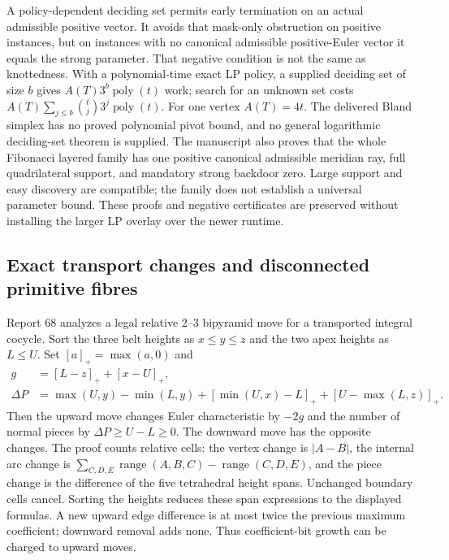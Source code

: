 A policy-dependent deciding set permits early termination on an actual
admissible positive vector. It avoids that mask-only obstruction on positive
instances, but on instances with no canonical admissible positive-Euler
vector it equals the strong parameter. That negative condition is not the
same as knottedness. With a polynomial-time exact LP policy, a supplied
deciding set of size $b$ gives $A(T)3^b\operatorname{poly}(t)$ work; search
for an unknown set costs
$A(T)\sum_{j\le b}\binom tj3^j\operatorname{poly}(t)$.
For one vertex $A(T)=4t$. The delivered Bland simplex has no proved
polynomial pivot bound, and no general logarithmic deciding-set theorem
is supplied. The manuscript also proves that the whole Fibonacci layered
family has one positive canonical admissible meridian ray, full
quadrilateral support, and mandatory strong backdoor zero. Large support
and easy discovery are compatible; the family does not establish a
universal parameter bound. These proofs and negative certificates are
preserved without installing the larger LP overlay over the newer runtime.

\subsection{Exact transport changes and disconnected primitive fibres}

Report 68 analyzes a legal relative $2$--$3$ bipyramid move for a transported
integral cocycle. Sort the three belt heights as $x\le y\le z$ and the
two apex heights as $L\le U$. Set $[a]_+=\max(a,0)$ and
\begin{align*}
 g&=[L-z]_+ +[x-U]_+,\\
 \Delta P&=\max(U,y)-\min(L,y)
       +[\min(U,x)-L]_+ +[U-\max(L,z)]_+.
\end{align*}
Then the upward move changes Euler characteristic by $-2g$ and the number
of normal pieces by $\Delta P\ge U-L\ge0$. The downward move has the
opposite changes. The proof counts relative cells: the vertex change is
$|A-B|$, the internal arc change is
$\sum_{C,D,E}\operatorname{range}(A,B,C)-\operatorname{range}(C,D,E)$,
and the piece change is the difference of the five tetrahedral height
spans. Unchanged boundary cells cancel. Sorting the heights reduces these
span expressions to the displayed formulas. A new upward edge difference
is at most twice the previous maximum coefficient; downward removal adds
none. Thus coefficient-bit growth can be charged to upward moves.

